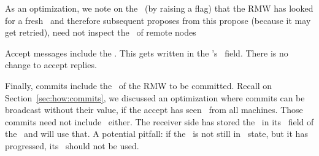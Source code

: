 \custvspace{} As an optimization, we note on the \locentry~(by raising a flag) that the RMW has looked for a fresh \basets~and therefore subsequent proposes from this propose (because it may get retried), need not inspect the \basets~of remote nodes

\custvspace{} Accept messages include the \basets. This gets written in the \kv's \accbasets~field. There is no change to accept replies.

\custvspace{} Finally, commits include the \basets~of the RMW to be committed.  Recall on Section~\ref{sec:how:commits}, we discussed an optimization where commits can be broadcast without their value, if the accept has seen \acks~from all machines. Those commits need not include \basets~either. The receiver side has stored the \basets~in its \accbasets~field of the \kv~and will use that. A potential pitfall: if the \kv~is not still in \acced~state, but it has progressed, its \accbasets~should not be used.